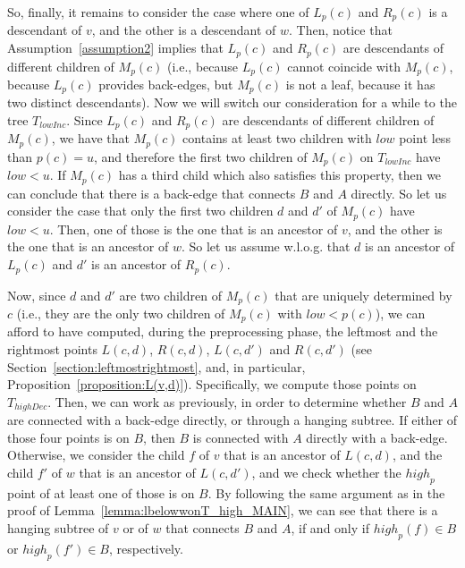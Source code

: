 \documentclass[11pt,a4paper]{article}
\begin{document}
So, finally, it remains to consider the case where one of $L_p(c)$ and $R_p(c)$ is a descendant of $v$, and the other is a descendant of $w$. Then, notice that Assumption~\ref{assumption2} implies that $L_p(c)$ and $R_p(c)$ are descendants of different children of $M_p(c)$ (i.e., because $L_p(c)$ cannot coincide with $M_p(c)$, because $L_p(c)$ provides back-edges, but $M_p(c)$ is not a leaf, because it has two distinct descendants). Now we will switch our consideration for a while to the tree $T_\mathit{lowInc}$. Since $L_p(c)$ and $R_p(c)$ are descendants of different children of $M_p(c)$, we have that $M_p(c)$ contains at least two children with $\mathit{low}$ point less than $p(c)=u$, and therefore the first two children of $M_p(c)$ on $T_\mathit{lowInc}$ have $\mathit{low}<u$. If $M_p(c)$ has a third child which also satisfies this property, then we can conclude that there is a back-edge that connects $B$ and $A$ directly. So let us consider the case that only the first two children $d$ and $d'$ of $M_p(c)$ have $\mathit{low}<u$. Then, one of those is the one that is an ancestor of $v$, and the other is the one that is an ancestor of $w$. So let us assume w.l.o.g. that $d$ is an ancestor of $L_p(c)$ and $d'$ is an ancestor of $R_p(c)$.

Now, since $d$ and $d'$ are two children of $M_p(c)$ that are uniquely determined by $c$ (i.e., they are the only two children of $M_p(c)$ with $\mathit{low}<p(c)$), we can afford to have computed, during the preprocessing phase, the leftmost and the rightmost points $L(c,d)$, $R(c,d)$, $L(c,d')$ and $R(c,d')$ (see Section~\ref{section:leftmostrightmost}, and, in particular, Proposition~\ref{proposition:L(v,d)}). Specifically, we compute those points on $T_\mathit{highDec}$. Then, we can work as previously, in order to determine whether $B$ and $A$ are connected with a back-edge directly, or through a hanging subtree. If either of those four points is on $B$, then $B$ is connected with $A$ directly with a back-edge. Otherwise, we consider the child $f$ of $v$ that is an ancestor of $L(c,d)$, and the child $f'$ of $w$ that is an ancestor of $L(c,d')$, and we check whether the $\mathit{high}_p$ point of at least one of those is on $B$. By following the same argument as in the proof of Lemma~\ref{lemma:lbelowwonT_high_MAIN}, we can see that there is a hanging subtree of $v$ or of $w$ that connects $B$ and $A$, if and only if $\mathit{high}_p(f)\in B$ or $\mathit{high}_p(f')\in B$, respectively.
\end{document}
